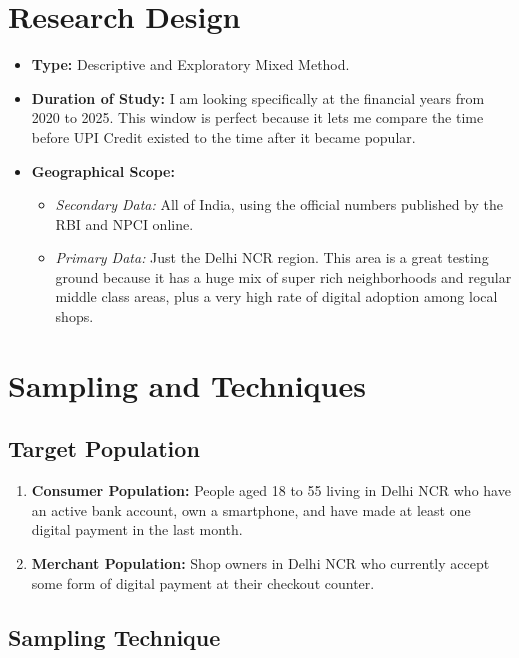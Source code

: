 \section{Research Design}

\begin{itemize}
    \item \textbf{Type:} Descriptive and Exploratory Mixed Method.
    \item \textbf{Duration of Study:} I am looking specifically at the financial years from 2020 to 2025. This window is perfect because it lets me compare the time before UPI Credit existed to the time after it became popular.
    \item \textbf{Geographical Scope:}
    \begin{itemize}
        \item \textit{Secondary Data:} All of India, using the official numbers published by the RBI and NPCI online.
        \item \textit{Primary Data:} Just the Delhi NCR region. This area is a great testing ground because it has a huge mix of super rich neighborhoods and regular middle class areas, plus a very high rate of digital adoption among local shops.
    \end{itemize}
\end{itemize}

\section{Sampling and Techniques}

\subsection{Target Population}

\begin{enumerate}
    \item \textbf{Consumer Population:} People aged 18 to 55 living in Delhi NCR who have an active bank account, own a smartphone, and have made at least one digital payment in the last month.
    \item \textbf{Merchant Population:} Shop owners in Delhi NCR who currently accept some form of digital payment at their checkout counter.
\end{enumerate}

\subsection{Sampling Technique}

